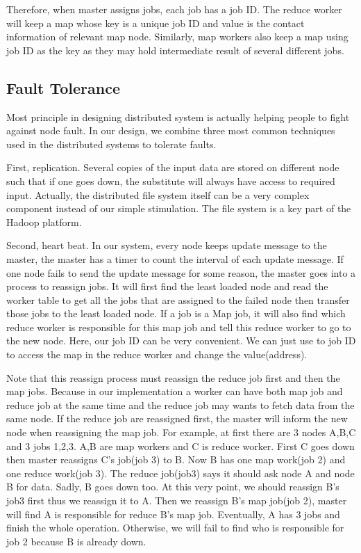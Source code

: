 \documentclass[12pt]{article}
\begin{document}
Therefore, when master assigns jobs, each job has a job ID. The reduce worker will keep a map whose key is a unique job ID and value is the contact information of relevant map node. Similarly, map workers also keep a map using job ID as the key as they may hold intermediate result of several different jobs.
    
\subsection{Fault Tolerance}

Most principle in designing distributed system is actually helping people to fight against node fault. In our design, we combine three most common techniques used in the distributed systems to tolerate faults.

First, replication. Several copies of the input data are stored on different node such that if one goes down, the substitute will always have access to required input. Actually, the distributed file system itself can be a very complex component instead of our simple stimulation. The file system is a key part of the Hadoop platform.   

Second, heart beat. In our system, every node keeps update message to the master, the master has a timer to count the interval of each update message. If one node fails to send the update message for some reason, the master goes into a process to reassign jobs. It will first find the least loaded node and read the worker table to get all the jobs that are assigned to the failed node then transfer those jobs to the least loaded node. If a job is a Map job, it will also find which reduce worker is responsible for this map job and tell this reduce worker to go to the new node. Here, our job ID can be very convenient. We can just use to job ID to access the map in the reduce worker and change the value(address).
 
Note that this reassign process must reassign the reduce job first and then the map jobs. Because in our implementation a worker can have both map job and reduce job at the same time and the reduce job may wants to fetch data from the same node. If the reduce job are reassigned first, the master will inform the new node when reassigning the map job. For example, at first there are 3 nodes A,B,C and 3 jobs 1,2,3. A,B are map workers and C is reduce worker. First C goes down then master reassigns C's job(job 3) to B. Now B has one map work(job 2) and one reduce work(job 3). The reduce job(job3) says it should ask node A and node B for data. Sadly, B goes down too. At this very point, we should reassign B's job3 first thus we reassign it to A. Then we reassign B's map job(job 2), master will find A is responsible for reduce B's map job. Eventually, A has 3 jobs and finish the whole operation. Otherwise, we will fail to find who is responsible for job 2 because B is already down.
\end{document}
